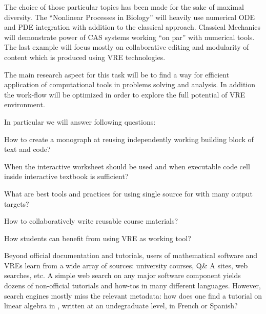 \begin{workpackage}[id=dissem,wphases=18-48!.5,
  title=Dissemination and Community Building,
  lead=PS,
  PSRM=10, %
  SARM=18,
  USORM=10,
  USHRM=8,
  USRM=24,
  UVRM=2,
  UBRM=4,
]
\begin{tasklist}
\begin{task}[title=Demonstrator: interactive books,
id=ibook]
The choice of those particular topics has been made for the sake of maximal diversity. The ``Nonlinear Processes in Biology'' will heavily use numerical ODE and PDE integration with addition to the classical approach. Classical Mechanics will demonstrate power of CAS systems working ``on par'' with numerical tools. The last example will focus mostly on collaborative editing and modularity of content which is produced using VRE technologies. 

The main research aspect for this task will be to find a way for efficient application of computational tools in problems solving and analysis. In addition the work-flow will be optimized in order to explore the full potential of VRE environment. 

In particular we will answer following questions:

\begin{compactitem}
\item How to create a monograph at reusing independently working   building block of text and code?
\item When the interactive worksheet should be used and when  executable code cell inside interactive textbook is sufficient?
\item What are best tools and practices for using single source for with many output targets? 
\item How to collaboratively write reusable course materials?
\item How students can benefit from  using VRE as working tool?
\end{compactitem}


\end{task}

\begin{task}[title=Demonstrator: Computational mathematics resources indexing service,
id=index-librorum-salvificorum]
Beyond official documentation and tutorials, users of mathematical
software and VREs learn from a wide array of sources: university
courses, Q\& A sites, web searches, etc.  A simple web search on any
major software component yields dozens of non-official tutorials and
how-tos in many different languages. However, search engines mostly
miss the relevant metadata: how does one find a tutorial on linear
algebra in \PariGP, written at an undegraduate level, in French or
Spanish?


\end{task}
\end{tasklist}
\end{workpackage}
